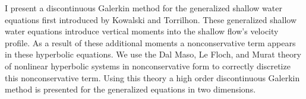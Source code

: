 
I present a discontinuous Galerkin method for the generalized shallow water equations
first introduced by Kowalski and Torrilhon.
These generalized shallow water equations introduce vertical moments into the shallow
flow's velocity profile.
As a result of these additional moments a nonconservative term appears in these
hyperbolic equations.
We use the Dal Maso, Le Floch, and Murat theory of nonlinear hyperbolic systems in
nonconservative form to correctly discretize this nonconservative term.
Using this theory a high order discontinuous Galerkin method is presented for the
generalized equations in two dimensions.
